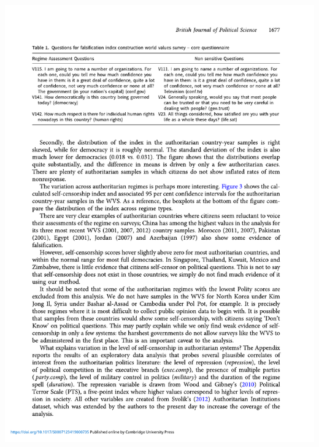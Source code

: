 \documentclass[
  10pt,
  ignorenonframetext,
]{beamer}
\begin{document}
\begin{frame}
\begin{center}\includegraphics[width=0.9\linewidth]{Figs/Examples/truex_table} \end{center}
\end{frame}
\end{document}
